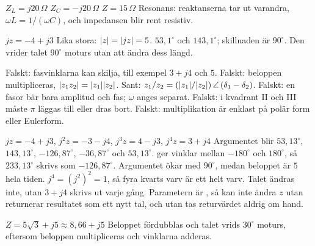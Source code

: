 \begin{facit}
  $Z_L = j20\,\Omega$  $Z_C = -j20\,\Omega$  $Z = 15\,\Omega$
 Resonans: reaktanserna tar ut varandra, $\omega L = 1/(\omega C)$, och impedansen blir
rent resistiv.

  $jz = -4 + j3$  Lika stora: $\lvert z\rvert = \lvert jz\rvert = 5$.
 $53{,}1^{\circ}$ och $143{,}1^{\circ}$; skillnaden är $90^{\circ}$.
 Den vrider talet $90^{\circ}$ moturs utan att ändra dess längd.

  Falskt: fasvinklarna kan skilja, till exempel $3 + j4$ och $5$.
 Falskt: beloppen multipliceras, $\lvert z_1z_2\rvert = \lvert z_1\rvert\lvert z_2\rvert$.
 Sant: $z_1/z_2 = (\lvert z_1\rvert/\lvert z_2\rvert)\,\angle\,(\delta_1 - \delta_2)$.
 Falskt: en fasor bär bara amplitud och fas; $\omega$ anges separat.
 Falskt: i kvadrant II och III måste $\pi$ läggas till eller dras bort.
 Falskt: multiplikation är enklast på polär form eller Eulerform.

  $jz = -4 + j3$, $j^2 z = -3 - j4$, $j^3 z = 4 - j3$, $j^4 z = 3 + j4$
 Argumentet blir $53{,}13^{\circ}$, $143{,}13^{\circ}$, $-126{,}87^{\circ}$,
$-36{,}87^{\circ}$ och $53{,}13^{\circ}$.  ger vinklar mellan $-180^{\circ}$ och
$180^{\circ}$, så $233{,}13^{\circ}$ skrivs som $-126{,}87^{\circ}$.
 Argumentet ökar med $90^{\circ}$, medan beloppet är $5$ hela tiden. $j^4 = (j^2)^2 = 1$, så
fyra kvarts varv är ett helt varv.
 Talet ändras inte, utan $3 + j4$ skrivs ut varje gång. Parametern är ,
så  kan inte ändra $z$ utan returnerar resultatet som ett nytt tal, och
utan  tas returvärdet aldrig om hand.

  $Z = 5\sqrt{3} + j5 \approx 8{,}66 + j5$
 Beloppet fördubblas och talet vrids $30^{\circ}$ moturs, eftersom beloppen multipliceras
och vinklarna adderas.

\end{facit}

